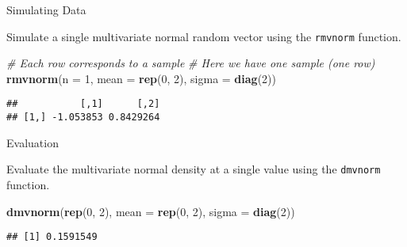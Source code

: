 \documentclass[ignorenonframetext,]{beamer}
\newenvironment{Shaded}{\begin{snugshade}}{\end{snugshade}}
\newcommand{\KeywordTok}[1]{\textcolor[rgb]{0.13,0.29,0.53}{\textbf{#1}}}
\newcommand{\DataTypeTok}[1]{\textcolor[rgb]{0.13,0.29,0.53}{#1}}
\newcommand{\DecValTok}[1]{\textcolor[rgb]{0.00,0.00,0.81}{#1}}
\newcommand{\CommentTok}[1]{\textcolor[rgb]{0.56,0.35,0.01}{\textit{#1}}}
\newcommand{\NormalTok}[1]{#1}
\begin{document}
\begin{frame}[fragile]{Simulating Data}

Simulate a single multivariate normal random vector using the
\texttt{rmvnorm} function.

\begin{Shaded}
\begin{Highlighting}[]
\CommentTok{# Each row corresponds to a sample}
\CommentTok{# Here we have one sample (one row)}
\KeywordTok{rmvnorm}\NormalTok{(}\DataTypeTok{n =} \DecValTok{1}\NormalTok{, }\DataTypeTok{mean =} \KeywordTok{rep}\NormalTok{(}\DecValTok{0}\NormalTok{, }\DecValTok{2}\NormalTok{), }\DataTypeTok{sigma =} \KeywordTok{diag}\NormalTok{(}\DecValTok{2}\NormalTok{))}
\end{Highlighting}
\end{Shaded}

\begin{verbatim}
##           [,1]      [,2]
## [1,] -1.053853 0.8429264
\end{verbatim}

\end{frame}

\begin{frame}[fragile]{Evaluation}

Evaluate the multivariate normal density at a single value using the
\texttt{dmvnorm} function.

\begin{Shaded}
\begin{Highlighting}[]
\KeywordTok{dmvnorm}\NormalTok{(}\KeywordTok{rep}\NormalTok{(}\DecValTok{0}\NormalTok{, }\DecValTok{2}\NormalTok{), }\DataTypeTok{mean =} \KeywordTok{rep}\NormalTok{(}\DecValTok{0}\NormalTok{, }\DecValTok{2}\NormalTok{), }\DataTypeTok{sigma =} \KeywordTok{diag}\NormalTok{(}\DecValTok{2}\NormalTok{))}
\end{Highlighting}
\end{Shaded}

\begin{verbatim}
## [1] 0.1591549
\end{verbatim}

\end{frame}
\end{document}
